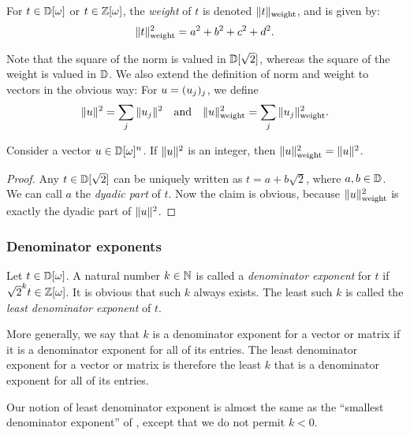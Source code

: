 \begin{definition}[Weight]
  For $t\in\mathbb{D}[\omega]$ or $t\in\mathbb{Z}[\omega]$, the {\em weight} of $t$ is denoted $\|t\|_{\rm weight}$, and is given by:
  \begin{equation}\label{eqn-weight}
    \|t\|_{\rm weight}^2 = a^2+b^2+c^2+d^2.
  \end{equation}
\end{definition}

Note that the square of the norm is valued in $\mathbb{D}[\sqrt{2}]$, whereas the square of the weight is
valued in $\mathbb{D}$. We also extend the definition of norm and weight to vectors in the obvious way: For
$u = (u_j)_j$, we define
\[
  \|u\|^2 = \sum_j\|u_j\|^2
  \quad\mbox{and}\quad
  \|u\|_{\rm weight}^2 = \sum_j\|u_j\|_{\rm weight}^2.
\]

\begin{lemma}\label{lem-ring-norm}
  Consider a vector $u\in\mathbb{D}[\omega]^n$. If $\|u\|^2$ is an integer, then $\|u\|_{\rm weight}^2=\|u\|^2$.
\end{lemma}

\begin{proof}
  Any $t\in\mathbb{D}[\sqrt{2}]$ can be uniquely written as $t=a+b\sqrt{2}$, where $a,b\in\mathbb{D}$. We can call
  $a$ the {\em dyadic part} of $t$. Now the claim is obvious, because $\|u\|_{\rm weight}^2$ is exactly the
  dyadic part of $\|u\|^2$.
\end{proof}


\subsubsection{Denominator exponents} %
\label{ssub:denominator_exponents}
\begin{definition}
  Let $t\in\mathbb{D}[\omega]$. A natural number $k\in\mathbb{N}$ is called a {\em denominator exponent} for $t$ if
  $\sqrt{2}^k t \in \mathbb{Z}[\omega]$. It is obvious that such $k$ always exists. The least such $k$ is called
  the {\em least denominator exponent} of $t$.

  More generally, we say that $k$ is a denominator exponent for a vector or matrix if it is a
  denominator exponent for all of its entries. The least denominator exponent for a vector or
  matrix is therefore the least $k$ that is a denominator exponent for all of its entries.
\end{definition}

\begin{remark}
  Our notion of least denominator exponent is almost the same as the ``smallest denominator
  exponent'' of {\cite{Kliuchnikov-et-al}}, except that we do not permit $k<0$.
\end{remark}

